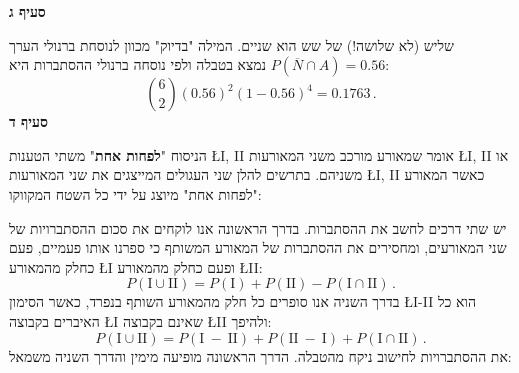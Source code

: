 \smallskip

\textbf{סעיף ג}

שליש (לא שלושה!) של שש הוא שניים. המילה "בדיוק" מכוון לנוסחת
ברנולי הערך
$P(\overline{N}\cap A)=0.56$
נמצא בטבלה ולפי נוסחה ברנולי ההסתברות היא:
\[
{6 \choose 2}(0.56)^2 (1-0.56)^4=0.1763\,.
\]
\textbf{סעיף ד}

הניסוח
"\textbf{לפחות אחת}"
משתי הטענות
\L{I, II}
אומר שמאורע מורכב משני המאורעות
\L{I, II}
או משניהם. בתרשים להלן שני העגולים המייצגים את שני המאורעות
\L{I, II}
כאשר המאורע "לפחות אחת" מיוצג על ידי כל השטח המקווקו:%
\label{p.venn}
\begin{center}
\end{center}
יש שתי דרכים לחשב את ההסתברות. בדרך הראשונה אנו לוקחים את סכום ההסתברויות של שני המאורעים, ומחסירים את ההסתברות של המאורע המשותף כי ספרנו אותו פעמיים, פעם כחלק מהמאורע
\L{I}
ופעם כחלק מהמאורע
\L{II}:
\[
P(\textrm{I} \cup \textrm{II}) = P(\textrm{I}) + P(\textrm{II}) - P(\textrm{I} \cap \textrm{II})\,.
\]
בדרך השניה אנו סופרים כל חלק מהמאורע השותף בנפרד, כאשר הסימון
\L{I-II}
הוא כל האיברים בקבוצה 
\L{I}
שאינם בקבוצה
\L{II}
ולהיפך:
\[
P(\textrm{I} \cup \textrm{II}) = P(\textrm{I}\:-\:\textrm{II}) + P(\textrm{II}\:-\:\textrm{I}) + P(\textrm{I} \cap \textrm{II})\,.
\]
את ההסתברויות לחישוב ניקח מהטבלה. הדרך הראשונה מופיעה מימין והדרך השניה משמאל:
